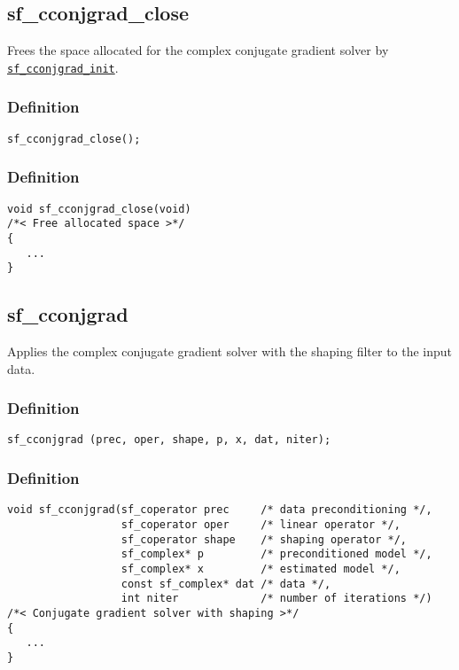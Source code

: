 \subsection{{sf\_cconjgrad\_close}}
Frees the space allocated for the complex conjugate gradient solver by \hyperref[sec:sf_cconjgrad_init]{\texttt{sf\_cconjgrad\_init}}.

\subsubsection*{Definition}
\begin{verbatim}sf_cconjgrad_close();\end{verbatim}

\subsubsection*{Definition}
\begin{verbatim}
void sf_cconjgrad_close(void) 
/*< Free allocated space >*/
{
   ...
}
\end{verbatim}




\subsection{{sf\_cconjgrad}}
Applies the complex conjugate gradient solver with the shaping filter to the input data.

\subsubsection*{Definition}
\begin{verbatim}sf_cconjgrad (prec, oper, shape, p, x, dat, niter);\end{verbatim}

\subsubsection*{Definition}
\begin{verbatim}
void sf_cconjgrad(sf_coperator prec     /* data preconditioning */, 
                  sf_coperator oper     /* linear operator */, 
                  sf_coperator shape    /* shaping operator */, 
                  sf_complex* p         /* preconditioned model */, 
                  sf_complex* x         /* estimated model */, 
                  const sf_complex* dat /* data */, 
                  int niter             /* number of iterations */)
/*< Conjugate gradient solver with shaping >*/
{
   ...
}
\end{verbatim}

